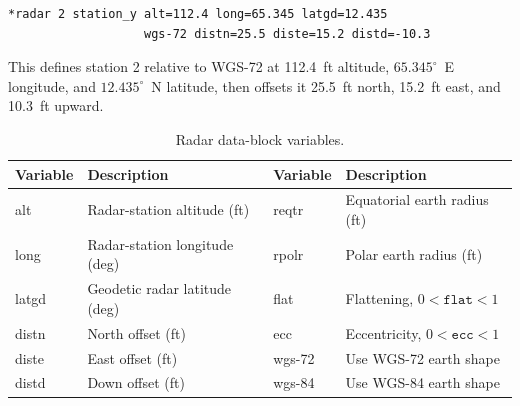 \begin{lstlisting}[style=taosmanual]
*radar 2 station_y alt=112.4 long=65.345 latgd=12.435
                   wgs-72 distn=25.5 diste=15.2 distd=-10.3
\end{lstlisting}

This defines station 2 relative to WGS-72 at 112.4~ft altitude,
$65.345^\circ$~E longitude, and $12.435^\circ$~N latitude, then offsets it
25.5~ft north, 15.2~ft east, and 10.3~ft upward.

\begin{table}[htbp]
  \centering
  \caption{Radar data-block variables.}
  \label{tab:radar-data-block-variables}
  \small
  \begin{tabularx}{0.97\linewidth}{@{}>{\ttfamily}lX>{\ttfamily}lX@{}}
    \toprule
    \normalfont Variable & Description & \normalfont Variable & Description \\
    \midrule
    alt & Radar-station altitude (ft) & reqtr & Equatorial earth radius (ft) \\
    long & Radar-station longitude (deg) & rpolr & Polar earth radius (ft) \\
    latgd & Geodetic radar latitude (deg) & flat & Flattening, $0<\texttt{flat}<1$ \\
    distn & North offset (ft) & ecc & Eccentricity, $0<\texttt{ecc}<1$ \\
    diste & East offset (ft) & wgs-72 & Use WGS-72 earth shape \\
    distd & Down offset (ft) & wgs-84 & Use WGS-84 earth shape \\
    \bottomrule
  \end{tabularx}
\end{table}
